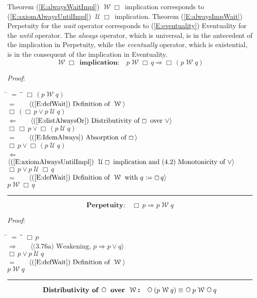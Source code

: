 \documentclass[12pt, fleqn, leqno]{article}
\newcommand{\lgap}{2pt}                             %
\newcommand{\mymathindent}{24pt}                    %
\newcommand{\impl}{\ensuremath{\Rightarrow}}        %
\newcommand{\foll}{\ensuremath{\Leftarrow}}         %
\newcommand{\Until}{\;\mathcal{U}\;}
\newcommand{\Wait}{\;\mathcal{W}\;}
\newcommand{\Next}{\;\,\text{\raisebox{3.5pt}{\circle{6}}}}
\newcommand{\Always}{\Box\,}
\newcommand{\myqed}{\rule[-.23ex]{1.2ex}{2.0ex}}
\newcommand{\myqedtab}{\hspace{384pt}}              %
\newcommand{\Gll} {\langle}                         %
\newcommand{\Ggg} {\rangle}                         %
\newcommand{\Hint}[1]     {\ \ \ $\Gll              \mbox{#1} \Ggg$ }   %
\begin{document}
Theorem (\ref{E:alwaysWaitImpl}) $\Wait\Always$ implication corresponds to (\ref{E:axiomAlwaysUntilImpl}) $\Until\Always$ implication.
Theorem (\ref{E:alwaysImpWait}) Perpetuity for the \textit{wait} operator corresponds to (\ref{E:eventuality}) Eventuality
for the \textit{until} operator.
The \textit{always} operator, which is universal, is in the antecedent of the implication in Perpetuity, while
the \textit{eventually} operator, which is existential, is in the consequent of the implication in Eventuality.
\begin{equation}\label{E:alwaysWaitImpl}
\textbf{$\Wait\Always$ implication:}\quad p\Wait\Always q \impl\Always (p \Wait q)
\end{equation}

\emph{Proof}:
\begin{tabbing}
\hspace{\mymathindent} \= $= \;$ \= \myqedtab \= \kill
\> \> $\Always (p \Wait q)$\\[\lgap]
\> $=$ \> \Hint{(\ref{E:defWait}) Definition of $\Wait$} \\[\lgap]
\> \> $\Always (\Always p\lor p \Until q)$\\[\lgap]
\> $\foll$ \> \Hint{(\ref{E:distAlwaysOr}) Distributivity of $\Always$ over $\lor$} \\[\lgap]
\> \> $\Always\Always p\lor \Always(p \Until q)$\\[\lgap]
\> $=$ \>  \Hint{(\ref{E:IdemAlways}) Absorption of $\Always$}\\[\lgap]
\> \> $\Always p\lor \Always(p \Until q)$\\[\lgap]
\> $\foll$ \> \Hint{(\ref{E:axiomAlwaysUntilImpl}) $\Until\Always$ implication and (4.2) Monotonicity of $\lor$}\\[\lgap]
\> \> $\Always p\lor p \Until \Always q$\\[\lgap]
\> $=$ \> \Hint{(\ref{E:defWait}) Definition of $\Wait$ with $q := \Always q$} \\[\lgap]
\> \> $p \Wait \Always q$ \quad \myqed
\end{tabbing}
\begin{equation}\label{E:alwaysImpWait}
\textbf{Perpetuity:}\quad \Always p \impl p \Wait q
\end{equation}

\emph{Proof}:
\begin{tabbing}
\hspace{\mymathindent} \= $= \;$ \= \myqedtab \= \kill
\> \> $\Always p$\\[\lgap]
\> $\impl$ \> \Hint{(3.76a) Weakening, $p\impl p\lor q$} \\[\lgap]
\> \> $\Always p \lor p \Until q$\\[\lgap]
\> $=$ \> \Hint{(\ref{E:defWait}) Definition of $\Wait$} \\[\lgap]
\> \> $p \Wait q$ \quad \myqed
\end{tabbing}
\begin{equation}\label{E:waitNextDist}
\textbf{Distributivity of $\Next$ over $\Wait$:}\quad \Next (p \Wait q) \equiv \Next p \Wait \Next q
\end{equation}
\end{document}
